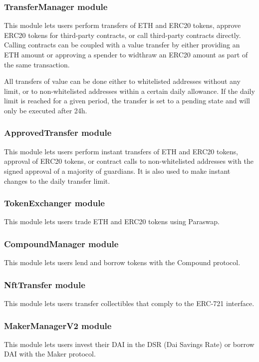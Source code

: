 \documentclass[12pt]{article}
\begin{document}
\subsubsection{TransferManager module}

This module lets users perform transfers of ETH and ERC20 tokens, approve ERC20 tokens for third-party contracts, or call third-party contracts directly. Calling contracts can be coupled with a value transfer by either providing an ETH amount or approving a spender to widthraw an ERC20 amount as part of the same transaction.

All transfers of value can be done either to whitelisted addresses without any limit, or to non-whitelisted addresses within a certain daily allowance. If the daily limit is reached for a given period, the transfer is set to a pending state and will only be executed after 24h.

\subsubsection{ApprovedTransfer module}

This module lets users perform instant transfers of ETH and ERC20 tokens, approval of ERC20 tokens, or contract calls to non-whitelisted addresses with the signed approval of a majority of guardians. It is also used to make instant changes to the daily transfer limit.

\subsubsection{TokenExchanger module}

This module lets users trade ETH and ERC20 tokens using Paraswap.

\subsubsection{CompoundManager module}

This module lets users lend and borrow tokens with the Compound protocol. 

\subsubsection{NftTransfer module}

This module lets users transfer collectibles that comply to the ERC-721 interface.  

\subsubsection{MakerManagerV2 module}

This module lets users invest their DAI in the DSR (Dai Savings Rate) or borrow DAI with the Maker protocol. 
\end{document}
